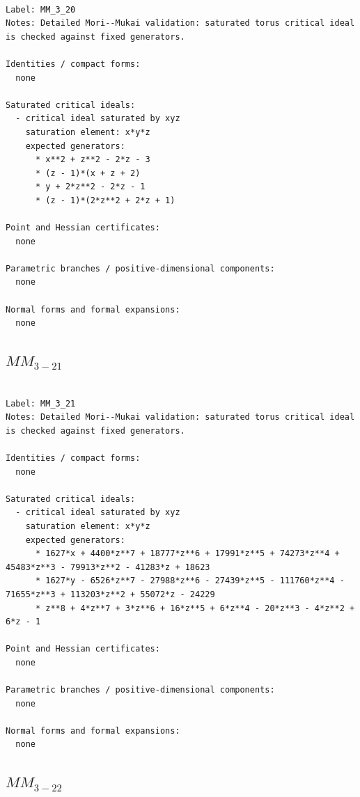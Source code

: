 \documentclass[10pt,a4paper]{article}
\begin{document}
\begin{lstlisting}

Label: MM_3_20
Notes: Detailed Mori--Mukai validation: saturated torus critical ideal is checked against fixed generators.

Identities / compact forms:
  none

Saturated critical ideals:
  - critical ideal saturated by xyz
    saturation element: x*y*z
    expected generators:
      * x**2 + z**2 - 2*z - 3
      * (z - 1)*(x + z + 2)
      * y + 2*z**2 - 2*z - 1
      * (z - 1)*(2*z**2 + 2*z + 1)

Point and Hessian certificates:
  none

Parametric branches / positive-dimensional components:
  none

Normal forms and formal expansions:
  none

\end{lstlisting}

\subsection*{$ MM_{3-21} $}

\begin{lstlisting}

Label: MM_3_21
Notes: Detailed Mori--Mukai validation: saturated torus critical ideal is checked against fixed generators.

Identities / compact forms:
  none

Saturated critical ideals:
  - critical ideal saturated by xyz
    saturation element: x*y*z
    expected generators:
      * 1627*x + 4400*z**7 + 18777*z**6 + 17991*z**5 + 74273*z**4 + 45483*z**3 - 79913*z**2 - 41283*z + 18623
      * 1627*y - 6526*z**7 - 27988*z**6 - 27439*z**5 - 111760*z**4 - 71655*z**3 + 113203*z**2 + 55072*z - 24229
      * z**8 + 4*z**7 + 3*z**6 + 16*z**5 + 6*z**4 - 20*z**3 - 4*z**2 + 6*z - 1

Point and Hessian certificates:
  none

Parametric branches / positive-dimensional components:
  none

Normal forms and formal expansions:
  none

\end{lstlisting}

\subsection*{$ MM_{3-22} $}
\end{document}
